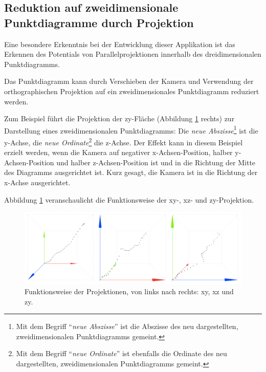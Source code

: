 \subsection{Reduktion auf zweidimensionale Punktdiagramme durch Projektion}

Eine besondere Erkenntnis bei der Entwicklung dieser Applikation ist das Erkennen des Potentials von Parallelprojektionen innerhalb des dreidimensionalen Punktdiagramms.

Das Punktdiagramm kann durch Verschieben der Kamera und Verwendung der orthographischen Projektion auf ein zweidimensionales Punktdiagramm reduziert werden.

Zum Beispiel führt die Projektion der zy-Fläche (Abbildung \ref{fig:compare_projections} rechts) zur Darstellung eines zweidimensionalen Punktdiagramms: 
Die \textit{neue Abszisse}\footnote{Mit dem Begriff "`\textit{neue Abszisse}"' ist die Abszisse des neu dargestellten, zweidimensionalen Punktdiagramms gemeint.} ist die y-Achse, die \textit{neue Ordinate}\footnote{Mit dem Begriff "`\textit{neue Ordinate}"' ist ebenfalls die Ordinate des neu dargestellten, zweidimensionalen Punktdiagramms gemeint.} die z-Achse. 
Der Effekt kann in diesem Beispiel erzielt werden, wenn die Kamera auf negativer x-Achsen-Position, halber y-Achsen-Position und halber z-Achsen-Position ist und in die Richtung der Mitte des Diagramms ausgerichtet ist. Kurz gesagt, die Kamera ist in die Richtung der x-Achse ausgerichtet.

Abbildung \ref{fig:compare_projections} veranschaulicht die Funktionsweise der xy-, xz- und zy-Projektion.

\begin{figure}[!htbp]
	\centering
	\begin{minipage}{\textwidth}
		\includegraphics[width=\linewidth]{images/compare_projections}
	\end{minipage}
	\caption[Funktionweise der xy-, xz- und zy-Projektion]{Funktionsweise der Projektionen, von links nach rechts: xy, xz und zy.}
	\label{fig:compare_projections}
\end{figure}


